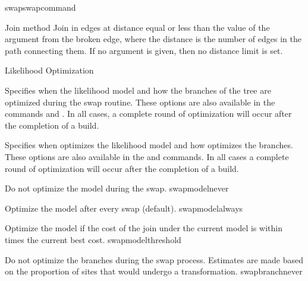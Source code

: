 \begin{command}{swap}{swapcommand}
\begin{arguments}
\begin{argumentgroup}{Join method}
                {Join in edges at distance equal or less than the value of the argument
                from the broken edge, where the distance is the number of edges
                in the path connecting them. If no argument is given, then no
                distance limit is set.}
                {}
            
        \end{argumentgroup}

        \begin{argumentgroup}{Likelihood Optimization}
            {Specifies when the likelihood model and how the branches of the
            tree are optimized during the swap routine. These options are also
            available in the commands  and .
            In all cases, a complete round of optimization will occur
            after the completion of a build.

                {Specifies when \poy optimizes the likelihood model and how \poy optimizes
            	the branches. These options are also available in the
            	 and  commands. In all cases a
            	complete round of optimization will occur after the completion of a
            	build.
                
                \begin{description}

                        {Do not optimize the model during the swap.}
                        {swapmodelnever}

                        {Optimize the model after every swap (default).}
                        {swapmodelalways}

                        {Optimize the model if the cost of the join under the
                        current model is within  times the
                        current best cost.}
                        {swapmodelthreshold}

                        {Do not optimize the branches during the swap process.
                        Estimates are made based on the proportion of sites that
                        would undergo a transformation.}
                        {swapbranchnever}


\end{description}}}
\end{argumentgroup}
\end{arguments}
\end{command}
